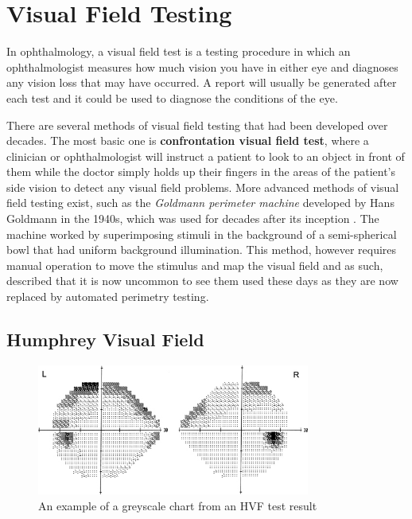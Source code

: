 \documentclass{l4proj}
\begin{document}
\section{Visual Field Testing}
In ophthalmology, a visual field test is a testing procedure in which an ophthalmologist measures how much vision you have in either eye and diagnoses any vision loss that may have occurred. A report will usually be generated after each test and it could be used to diagnose the conditions of the eye.

There are several methods of visual field testing that had been developed over decades. The most basic one is \textbf{confrontation visual field test}, where a clinician or ophthalmologist will instruct a patient to look to an object in front of them while the doctor simply holds up their fingers in the areas of the patient's side vision to detect any visual field problems. More advanced methods of visual field testing exist, such as the \textit{Goldmann perimeter machine} developed by Hans Goldmann in the 1940s, which was used for decades after its inception \cite{johnson2011history}. The machine worked by superimposing stimuli in the background of a semi-spherical bowl that had uniform background illumination. This method, however requires manual operation to move the stimulus and map the visual field and as such, \cite{JoyNCarroll2013} described that it is now uncommon to see them used these days as they are now replaced by automated perimetry testing.


\subsection{Humphrey Visual Field}

\begin{figure}[!h]
    \centering
    \includegraphics[width=0.8\textwidth ]{images/hvf-greyscale.png}
    \caption{An example of a greyscale chart from an HVF test result}
\end{figure}
\end{document}
